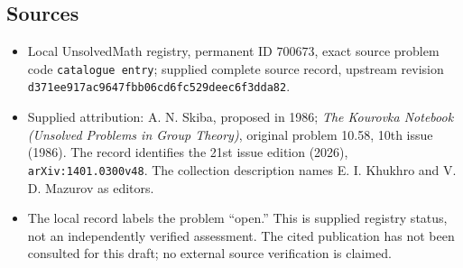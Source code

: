 \documentclass[11pt]{article}
\begin{document}
\subsection{Sources}
\begin{itemize}
\item Local UnsolvedMath registry, permanent ID \(700673\), exact source problem code \texttt{catalogue entry}; supplied complete source record, upstream revision \texttt{d371ee917ac9647fbb06cd6fc529deec6f3dda82}.
\item Supplied attribution: A. N. Skiba, proposed in 1986; \emph{The Kourovka Notebook (Unsolved Problems in Group Theory)}, original problem 10.58, 10th issue (1986). The record identifies the 21st issue edition (2026), \texttt{arXiv:1401.0300v48}. The collection description names E. I. Khukhro and V. D. Mazurov as editors.
\item The local record labels the problem ``open.'' This is supplied registry status, not an independently verified assessment. The cited publication has not been consulted for this draft; no external source verification is claimed.
\end{itemize}
\end{document}
